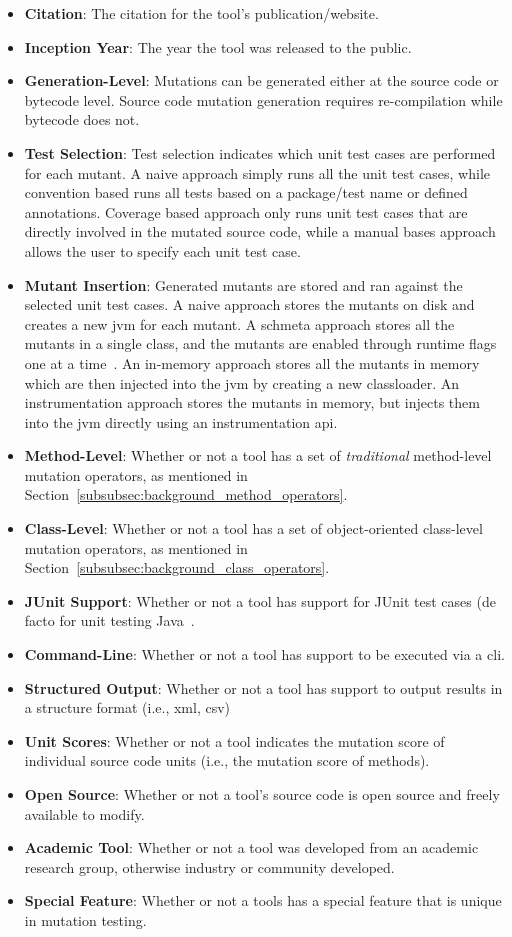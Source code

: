 \begin{itemize}
  \item \textbf{Citation}: The citation for the tool's publication/website.
  \item \textbf{Inception Year}: The year the tool was released to the public.
  \item \textbf{Generation-Level}: Mutations can be generated either at the source code or bytecode level. Source code mutation generation requires re-compilation while bytecode does not.
  \item \textbf{Test Selection}: Test selection indicates which unit test cases are performed for each mutant. A naive approach simply runs all the unit test cases, while convention based runs all tests based on a package/test name or defined annotations. Coverage based approach only runs unit test cases that are directly involved in the mutated source code, while a manual bases approach allows the user to specify each unit test case.
  \item \textbf{Mutant Insertion}: Generated mutants are stored and ran against the selected unit test cases. A naive approach stores the mutants on disk and creates a new \gls{jvm} for each mutant. A schmeta approach stores all the mutants in a single class, and the mutants are enabled through runtime flags one at a time~\cite{UOH93}. An in-memory approach stores all the mutants in memory which are then injected into the \gls{jvm} by creating a new classloader. An instrumentation approach stores the mutants in memory, but injects them into the \gls{jvm} directly using an instrumentation \gls{api}.
  \item \textbf{Method-Level}: Whether or not a tool has a set of \emph{traditional} method-level mutation operators, as mentioned in Section~\ref{subsubsec:background_method_operators}.
  \item \textbf{Class-Level}: Whether or not a tool has a set of object-oriented class-level mutation operators, as mentioned in Section~\ref{subsubsec:background_class_operators}.
  \item \textbf{JUnit Support}: Whether or not a tool has support for JUnit test cases (de facto for unit testing Java~\cite{JUnit}.
  \item \textbf{Command-Line}: Whether or not a tool has support to be executed via a \gls{cli}.
  \item \textbf{Structured Output}: Whether or not a tool has support to output results in a structure format (i.e., \gls{xml}, \gls{csv})
  \item \textbf{Unit Scores}: Whether or not a tool indicates the mutation score of individual source code units (i.e., the mutation score of methods).
  \item \textbf{Open Source}: Whether or not a tool's source code is open source and freely available to modify.
  \item \textbf{Academic Tool}: Whether or not a tool was developed from an academic research group, otherwise industry or community developed.
  \item \textbf{Special Feature}: Whether or not a tools has a special feature that is unique in mutation testing.
\end{itemize}

